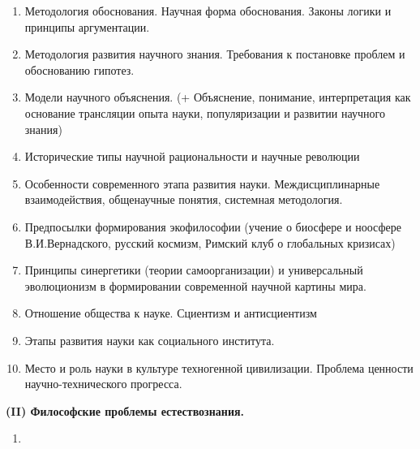 \documentclass[main.tex]{subfiles}
\begin{document}
\begin{enumerate}[leftmargin=*]
	\item Методология обоснования. Научная форма обоснования. Законы логики и принципы аргументации.
	\item Методология развития научного знания. Требования к постановке проблем и обоснованию гипотез.
	\item Модели научного объяснения. (+ Объяснение, понимание, интерпретация как основание трансляции опыта науки, популяризации и развитии научного знания)
	\item Исторические типы научной рациональности и научные революции
	\item Особенности современного этапа развития науки. Междисциплинарные взаимодействия, общенаучные понятия, системная методология.
	\item Предпосылки формирования экофилософии (учение о биосфере и ноосфере В.И.Вернадского, русский космизм, Римский клуб о глобальных кризисах)
	\item Принципы синергетики (теории самоорганизации) и универсальный эволюционизм в формировании современной научной картины мира.
	\item Отношение общества к науке. Сциентизм и антисциентизм
	\item Этапы развития науки как социального института.
	\item Место и роль науки в культуре техногенной цивилизации. Проблема ценности научно-технического прогресса.
\end{enumerate}

\vspace{7mm}
{\parindent0pt\textbf{(II) Философские проблемы естествознания.}}

\begin{enumerate}[leftmargin=*]
	\item	
\end{enumerate}
\end{document}
